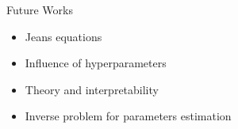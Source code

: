\documentclass[12pt, aspectratio=169]{beamer}
\begin{document}
%
%




\begin{frame}{Future Works}
    \begin{itemize}
        \item Jeans equations
        \item Influence of hyperparameters
        \item Theory and interpretability
        \item Inverse problem for parameters estimation
    \end{itemize}
\end{frame}


\end{document}
